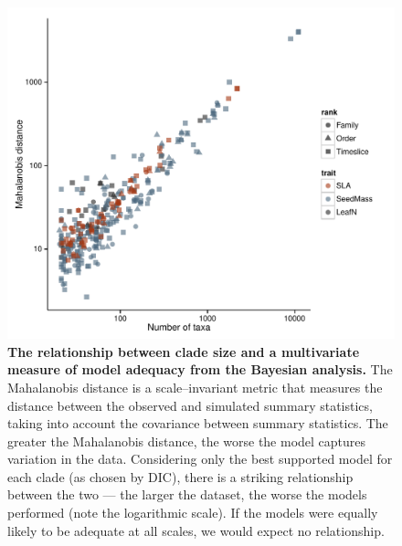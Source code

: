 \documentclass[a4paper,12pt]{article}
\begin{document}
\begin{figure}[p]
  \centering
  \includegraphics[scale=0.9]{figs/ad-size-bayes}
  \caption{\textbf{The relationship between clade size and a multivariate measure of model adequacy from the Bayesian analysis.} The Mahalanobis distance is a scale--invariant metric that measures the distance between the observed and simulated summary statistics, taking into account the covariance between summary statistics. The greater the Mahalanobis distance, the worse the model captures variation in the data. Considering only the best supported model for each clade (as chosen by DIC), there is a striking relationship between the two --- the larger the dataset, the worse the models performed (note the logarithmic scale). If the models were equally likely to be adequate at all scales, we would expect no relationship.}
  \label{fig:supp-size-adequacy}
\end{figure}
\end{document}
